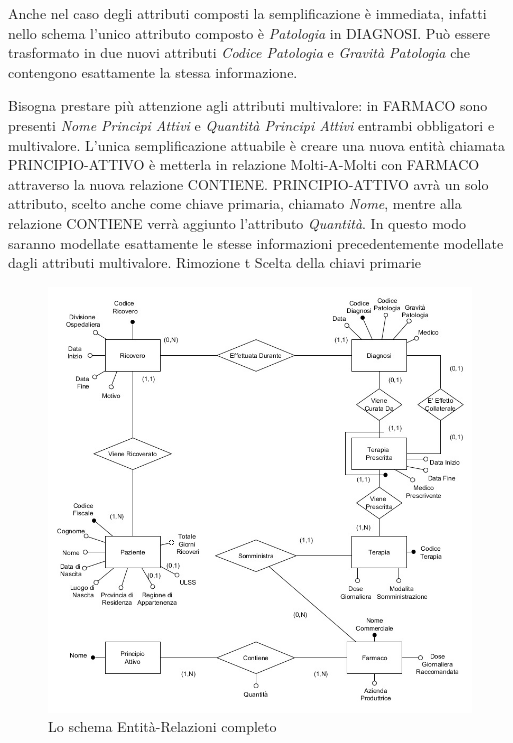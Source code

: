 \documentclass{article}
\begin{document}
Anche nel caso degli attributi composti la semplificazione è immediata, infatti
nello schema l'unico attributo composto è \textit{Patologia} in DIAGNOSI.  Può
essere trasformato in due nuovi attributi \textit{Codice Patologia} e
\textit{Gravità Patologia} che contengono esattamente la stessa informazione.

Bisogna prestare più attenzione agli attributi multivalore: in FARMACO sono
presenti \textit{Nome Principi Attivi} e \textit{Quantità Principi Attivi}
entrambi obbligatori e multivalore.  L'unica semplificazione attuabile è creare
una nuova entità chiamata PRINCIPIO-ATTIVO è metterla in relazione
Molti-A-Molti con FARMACO attraverso la nuova relazione CONTIENE.
PRINCIPIO-ATTIVO avrà un solo attributo, scelto anche come chiave primaria,
chiamato \textit{Nome}, mentre alla relazione CONTIENE verrà aggiunto
l'attributo \textit{Quantità}.  In questo modo saranno modellate esattamente le
stesse informazioni precedentemente modellate dagli attributi multivalore.
Rimozione t Scelta della chiavi primarie








\begin{figure}[H] %
	\centering
	\includegraphics[width=\linewidth]{schema2.jpg}
	\caption{Lo schema Entità-Relazioni completo}
	\label{schema_ER_ristrutturato}
\end{figure}
\end{document}
